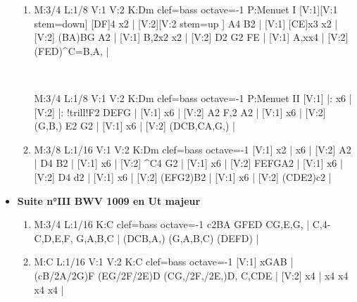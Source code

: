 \documentclass[a4paper,twoside]{article}
\begin{document}
\begin{center}
\begin{itemize}
\begin{enumerate}
  \item {}
\begin{abcsvg}
  M:3/4
  L:1/8
  V:1
  V:2
  K:Dm clef=bass octave=-1
  P:Menuet I
  [V:1][V:1 stem=down] [DF]4 x2 |
  [V:2][V:2 stem=up  ] A4    B2 |
  [V:1] [CE]x3 x2 |
  [V:2] (BA)BG A2 |
  [V:1] B,2x2 x2 |
  [V:2] D2 G2 FE |
  [V:1] A,xx4        |
  [V:2] (FED)^C=B,A, |
\end{abcsvg}
  \\
  \hspace*{\titlelen}
\begin{abcsvg}
  M:3/4
  L:1/8
  V:1
  V:2
  K:Dm clef=bass octave=-1
  P:Menuet II
  [V:1] |:        x6      |
  [V:2] |: !trill!F2 DEFG |
  [V:1] x6        |
  [V:2] A2 F,2 A2 |
  [V:1] x6           |
  [V:2] (G,B,) E2 G2 |
  [V:1] x6          |
  [V:2] (DCB,CA,G,) |
\end{abcsvg}
  \makebox[2cm][l]{ \dotfill\ \pageref{IImenuets}}
  \par\vspace{\titleseplen}

  \item {}
\begin{abcsvg}
  M:3/8
  L:1/16
  V:1
  V:2
  K:Dm clef=bass octave=-1
  [V:1] x2 | x6    |
  [V:2] A2 | D4 B2 |
  [V:1]  x6    |
  [V:2] ^C4 G2 |
  [V:1]  x6    |
  [V:2] FEFGA2 |
  [V:1]  x6   |
  [V:2] D4 d2 |
  [V:1]  x6      |
  [V:2] (EFG2)B2 |
  [V:1]  x6      |
  [V:2] (CDE2)c2 |
\end{abcsvg}
  \makebox[2cm][l]{ \dotfill\ \pageref{IIgigue}}
  \end{enumerate}
  \newpage
  
  \item \textbf{Suite n°III BWV 1009 en Ut majeur} \dotfill\ \pageref{SuiteIII}
\begin{enumerate}
  \item {}
\begin{abcsvg}
  M:3/4
  L:1/16
  K:C clef=bass octave=-1
  c2BA GFED CG,E,G, |
  C,4- C,D,E,F, G,A,B,C |
  (DCB,A,) (G,A,B,C) (DEFD) |
\end{abcsvg}
  \makebox[2cm][l]{ \dotfill\ \pageref{IIIprelude}}
  \par\vspace{\titleseplen}

  \item {}
\begin{abcsvg}
  M:C
  L:1/16
  V:1
  V:2
  K:C clef=bass octave=-1
  [V:1] xGAB | (cB/2A/2G)F (EG/2F/2E)D (CG,/2F,/2E,)D, C,CDE |
  [V:2] x4   |  x4          x4          x4             x4    |
\end{abcsvg}
  \makebox[2cm][l]{ \dotfill\ \pageref{IIIallemande}}
  \par\vspace{\titleseplen}


\end{enumerate}
\end{itemize}
\end{center}
\end{document}
